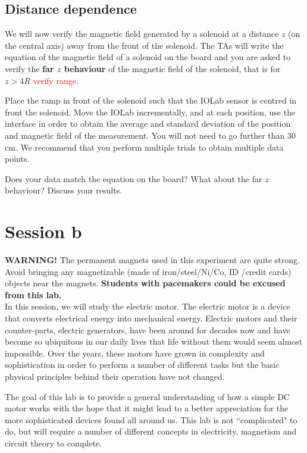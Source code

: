 \documentclass[12pt]{report}
\def \todo #1{\textcolor{red}{#1}}
\begin{document}
\subsection{Distance dependence}
We will now verify the magnetic field generated by a solenoid at a distance $z$ (on the central axis) away from the front of the solenoid. The TAs will write the equation of the magnetic field of a solenoid on the board and you are asked to verify the \textbf{far $z$ behaviour} of the magnetic field of the solenoid, that is for $z>4R$ \todo{verify range}.

Place the ramp in front of the solenoid such that the IOLab sensor is centred in front the solenoid. Move the IOLab incrementally, and at each position, use the interface in order to obtain the average and standard deviation of the position and magnetic field of the measurement. You will not need to go further than 30 cm. We recommend that you perform multiple trials to obtain multiple data points.

Does your data match the equation on the board? What about the far $z$ behaviour? Discuss your results.

\section{Session b}
\Large{\textbf{WARNING!}} \normalsize The permanent magnets used in this experiment are quite strong. Avoid bringing any magnetizable (made of iron/steel/Ni/Co, ID /credit cards) objects near the magnets. \textbf{Students with pacemakers could be excused from this lab.} \\

In this session, we will study the electric motor. The electric motor is a device that converts electrical energy into mechanical energy. Electric motors and their counter-parts, electric generators, have been around for decades now and have become so ubiquitous in our daily lives that life without them would seem almost impossible. Over the years, these motors have grown in complexity and sophistication in order to perform a number of different tasks but the basic physical principles behind their operation have not changed.

The goal of this lab is to provide a general understanding of how a simple DC motor works with the hope that it might lead to a better appreciation for the more sophisticated devices found all around us. This lab is not ``complicated" to do, but will require a number of different concepts in electricity, magnetism and circuit theory to complete.
\end{document}
